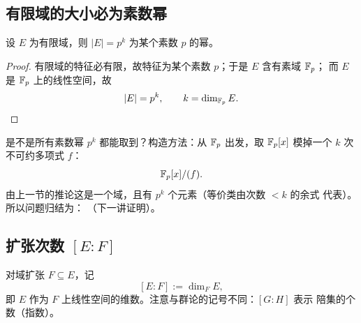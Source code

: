 \subsection{有限域的大小必为素数幂}

\begin{theorem}[有限域的大小]
设 $E$ 为有限域，则 $|E| = p^k$ 为某个素数 $p$ 的幂。
\end{theorem}

\begin{proof}
有限域的特征必有限，故特征为某个素数 $p$；于是 $E$ 含有素域 $\mathbb{F}_p$；
而 $E$ 是 $\mathbb{F}_p$ 上的线性空间，故
\[
  |E| = p^k, \qquad k = \dim_{\mathbb{F}_p} E.
\]
\end{proof}

\begin{remark}[自然的问题]
是不是所有素数幂 $p^k$ 都能取到？构造方法：从 $\mathbb{F}_p$ 出发，取
$\mathbb{F}_p[x]$ 模掉一个 $k$ 次不可约多项式 $f$：
\[
  \mathbb{F}_p[x]/(f).
\]
由上一节的推论这是一个域，且有 $p^k$ 个元素（等价类由次数 $<k$ 的余式
代表）。所以问题归结为：
（下一讲证明）。
\end{remark}

\subsection{扩张次数 \texorpdfstring{$[E:F]$}{[E:F]}}

\begin{definition}[扩张次数]
对域扩张 $F\subseteq E$，记
\[
  [E : F] := \dim_F E,
\]
即 $E$ 作为 $F$ 上线性空间的维数。注意与群论的记号不同：$[G:H]$ 表示
陪集的个数（指数）。
\end{definition}

